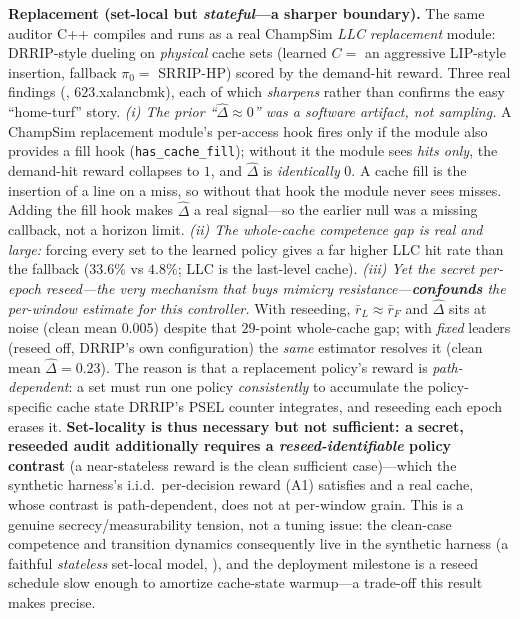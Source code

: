 \documentclass{article}
\newcommand{\dhat}{\hat{\Delta}}
\newcommand{\pizero}{\pi_0}
\begin{document}
\textbf{Replacement (set-local but \emph{stateful}---a sharper boundary).} The same
auditor C++ compiles and runs as a real ChampSim \emph{LLC replacement} module:
DRRIP-style dueling on \emph{physical} cache sets (learned $C=$ an aggressive
LIP-style insertion, fallback $\pizero=$ SRRIP-HP) scored by the demand-hit reward.
Three real findings (, $623$.xalancbmk), each of which
\emph{sharpens} rather than confirms the easy ``home-turf'' story.
\emph{(i) The prior ``$\dhat\!\approx\!0$'' was a software artifact, not sampling.}
A ChampSim replacement module's per-access hook fires only if the module also
provides a fill hook (\texttt{has\_cache\_fill}); without it the module sees
\emph{hits only}, the demand-hit reward collapses to $1$, and $\dhat$ is
\emph{identically} $0$. A cache fill is the insertion of a line on a miss, so without that hook the module never sees misses. Adding the fill hook makes $\dhat$ a real signal---so the
earlier null was a missing callback, not a horizon limit.
\emph{(ii) The whole-cache competence gap is real and large:} forcing every set to
the learned policy gives a far higher LLC hit rate than the fallback ($33.6\%$ vs $4.8\%$; LLC is the last-level cache).
\emph{(iii) Yet the secret per-epoch reseed---the very mechanism that buys mimicry
resistance---\textbf{confounds} the per-window estimate for this controller.} With
reseeding, $\bar r_L\!\approx\!\bar r_F$ and $\dhat$ sits at noise (clean mean
$0.005$) despite that $29$-point whole-cache gap; with \emph{fixed} leaders (reseed
off, DRRIP's own configuration) the \emph{same} estimator resolves it (clean mean
$\dhat\!=\!0.23$). The reason is that a replacement policy's reward is
\emph{path-dependent}: a set must run one policy \emph{consistently} to accumulate
the policy-specific cache state DRRIP's PSEL counter integrates, and reseeding each
epoch erases it. \textbf{Set-locality is thus necessary but not sufficient: a
secret, reseeded audit additionally requires a \emph{reseed-identifiable} policy
contrast} (a near-stateless reward is the clean sufficient case)---which the
synthetic harness's i.i.d.\ per-decision reward (A1) satisfies and a real cache,
whose contrast is path-dependent, does not at per-window grain. This is a genuine
secrecy/measurability tension, not a tuning issue: the clean-case competence and
transition dynamics consequently live in the synthetic harness (a faithful
\emph{stateless} set-local model, ), and the deployment milestone
is a reseed schedule slow enough to amortize cache-state warmup---a trade-off this
result makes precise.
\end{document}
